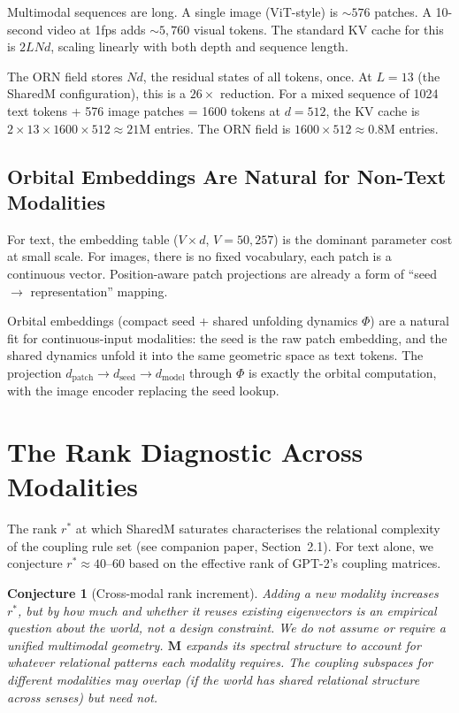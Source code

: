 \documentclass[11pt, a4paper]{article}
\newcommand{\M}{\mathbf{M}}
\theoremstyle{plain}
\newtheorem{conjecture}{Conjecture}
\theoremstyle{remark}
\begin{document}
Multimodal sequences are long.
A single image (ViT-style) is ${\sim}576$ patches.
A 10-second video at 1fps adds ${\sim}5{,}760$ visual tokens.
The standard KV cache for this is $2LNd$, scaling linearly with both depth and sequence length.

The ORN field stores $Nd$, the residual states of all tokens, once.
At $L = 13$ (the SharedM configuration), this is a $26\times$ reduction.
For a mixed sequence of 1024 text tokens + 576 image patches = 1600 tokens at $d = 512$, the KV cache is $2 \times 13 \times 1600 \times 512 \approx 21$M entries.
The ORN field is $1600 \times 512 \approx 0.8$M entries.

\subsection{Orbital Embeddings Are Natural for Non-Text Modalities}

For text, the embedding table ($V \times d$, $V = 50{,}257$) is the dominant parameter cost at small scale.
For images, there is no fixed vocabulary, each patch is a continuous vector.
Position-aware patch projections are already a form of ``seed $\to$ representation'' mapping.

Orbital embeddings (compact seed + shared unfolding dynamics $\Phi$) are a natural fit for continuous-input modalities:
the seed is the raw patch embedding, and the shared dynamics unfold it into the same geometric space as text tokens.
The projection $d_{\text{patch}} \to d_{\text{seed}} \to d_{\text{model}}$ through $\Phi$ is exactly the orbital computation, with the image encoder replacing the seed lookup.

\section{The Rank Diagnostic Across Modalities}

The rank $r^*$ at which SharedM saturates characterises the relational complexity of the coupling rule set (see companion paper, Section~2.1).
For text alone, we conjecture $r^* \approx 40$--$60$ based on the effective rank of GPT-2's coupling matrices.

\begin{conjecture}[Cross-modal rank increment]
Adding a new modality increases $r^*$, but by how much and whether it reuses existing eigenvectors is an empirical question about the world, not a design constraint.
We do not assume or require a unified multimodal geometry.
$\M$ expands its spectral structure to account for whatever relational patterns each modality requires.
The coupling subspaces for different modalities \emph{may} overlap (if the world has shared relational structure across senses) but need not.
\end{conjecture}
\end{document}
